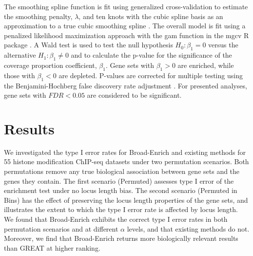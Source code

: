 \documentclass[11pt, oneside]{article}   	%
\begin{document}
The smoothing spline function is fit using generalized cross-validation to estimate the smoothing penalty, $\lambda$, and ten knots with the cubic spline basis as an approximation to a true cubic smoothing spline \cite{Wood:2010cl}. The overall model is fit using a penalized likelihood maximization approach with the gam function in the mgcv R package \cite{Wood:2010cl}. A Wald test is used to test the null hypothesis $H_0 : \beta_1 = 0$ versus the alternative $H_1 : \beta_1 \ne 0$ and to calculate the p-value for the significance of the coverage proportion coefficient, $\beta_1$. Gene sets with $\beta_1 > 0$ are enriched, while those with $\beta_1 < 0$ are depleted. P-values are corrected for multiple testing using the Benjamini-Hochberg false discovery rate adjustment \cite{Benjamini:1995cd}. For presented analyses, gene sets with $FDR < 0.05$ are considered to be significant.

\section*{Results}
We investigated the type I error rates for Broad-Enrich and existing methods for 55 histone modification ChIP-seq datasets under two permutation scenarios. Both permutations remove any true biological association between gene sets and the genes they contain. The first scenario (Permuted) assesses type I error of the enrichment test under no locus length bias. The second scenario (Permuted in Bins) has the effect of preserving the locus length properties of the gene sets, and illustrates the extent to which the type I error rate is affected by locus length. We found that Broad-Enrich exhibits the correct type I error rates in both permutation scenarios and at different $\alpha$ levels, and that existing methods do not. Moreover, we find that Broad-Enrich returns more biologically relevant results than GREAT at higher ranking.
\singlespace

\end{document}
